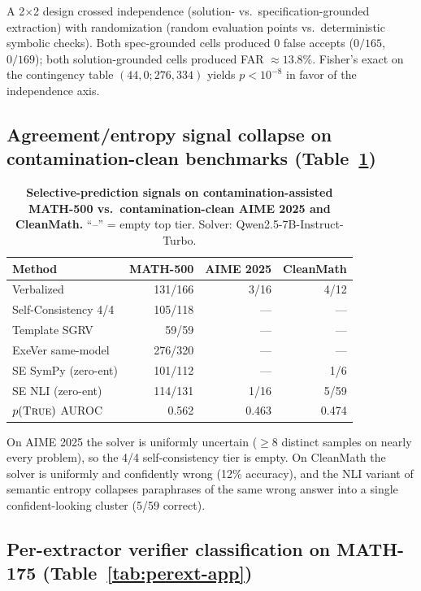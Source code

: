 \documentclass{article}
\begin{document}
A 2$\times$2 design crossed independence (solution- vs.\ specification-grounded extraction) with randomization (random evaluation points vs.\ deterministic symbolic checks). Both spec-grounded cells produced 0 false accepts ($0/165$, $0/169$); both solution-grounded cells produced FAR $\approx 13.8\%$. Fisher's exact on the contingency table $(44, 0; 276, 334)$ yields $p<10^{-8}$ in favor of the independence axis.

\subsection{Agreement/entropy signal collapse on contamination-clean benchmarks (Table~\ref{tab:contam})}

\begin{table}[h]
\centering
\caption{\textbf{Selective-prediction signals on contamination-assisted MATH-500 vs.\ contamination-clean AIME 2025 and CleanMath.} ``--'' = empty top tier. Solver: Qwen2.5-7B-Instruct-Turbo.}
\label{tab:contam}
\small
\begin{tabular}{lrrr}
\toprule
Method & MATH-500 & AIME 2025 & CleanMath \\
\midrule
Verbalized            & 131/166 & 3/16    & 4/12  \\
Self-Consistency 4/4  & 105/118 & ---     & ---   \\
Template SGRV         & 59/59   & ---     & ---   \\
ExeVer same-model     & 276/320 & ---     & ---   \\
SE SymPy (zero-ent)   & 101/112 & ---     & 1/6   \\
SE NLI (zero-ent)     & 114/131 & 1/16    & 5/59  \\
$p(\textsc{True})$ AUROC & 0.562 & 0.463 & 0.474 \\
\bottomrule
\end{tabular}
\end{table}

On AIME 2025 the solver is uniformly uncertain ($\geq 8$ distinct samples on nearly every problem), so the 4/4 self-consistency tier is empty. On CleanMath the solver is uniformly and confidently wrong (12\% accuracy), and the NLI variant of semantic entropy collapses paraphrases of the same wrong answer into a single confident-looking cluster (5/59 correct).

\subsection{Per-extractor verifier classification on MATH-175 (Table~\ref{tab:perext-app})}
\end{document}

